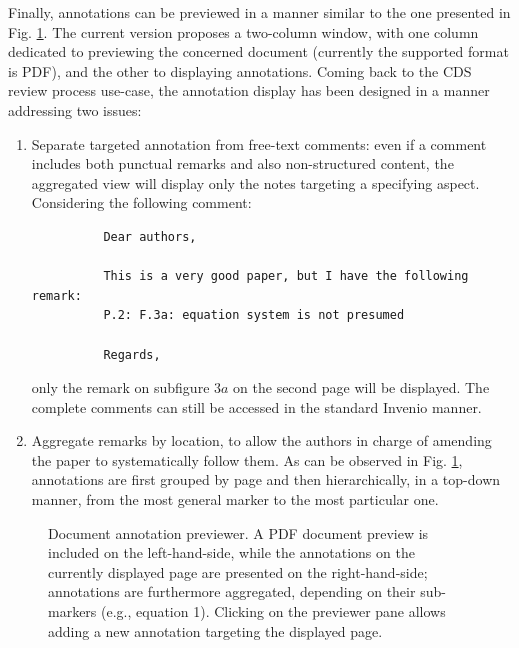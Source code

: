 Finally, annotations can be previewed in a manner similar to the one presented
in Fig. \ref{fig:noteview}. The current version proposes a two-column window,
with one column dedicated to previewing the concerned document (currently the
supported format is PDF), and the other to displaying annotations. Coming
back to the CDS review process use-case, the annotation display has been
designed in a manner addressing two issues:
\begin{enumerate}
  \item Separate targeted annotation from free-text comments: even if a comment
        includes both punctual remarks and also non-structured content, the
        aggregated view will display only the notes targeting a specifying
        aspect. Considering the following comment:
        \begin{verbatim}
          Dear authors,

          This is a very good paper, but I have the following remark:
          P.2: F.3a: equation system is not presumed 

          Regards,
        \end{verbatim}
        only the remark on subfigure $3a$ on the second page will be displayed.
        The complete comments can still be accessed in the standard Invenio
        manner.
  \item Aggregate remarks by location, to allow the authors in charge of
        amending the paper to systematically follow them. As can be observed in
        Fig. \ref{fig:noteview}, annotations are first grouped by page and then
        hierarchically, in a top-down manner, from the most general marker to
        the most particular one.
\end{enumerate}

\begin{figure}[!h]
  \centering
  \caption[Document annotation previewer]
          {Document annotation previewer. A PDF document preview is included on
           the left-hand-side, while the annotations on the currently displayed
           page are presented on the right-hand-side; annotations are
           furthermore aggregated, depending on their sub-markers (e.g.,
           equation 1). Clicking on the previewer pane allows adding a new
           annotation targeting the displayed page.}
  \label{fig:noteview}
\end{figure}
